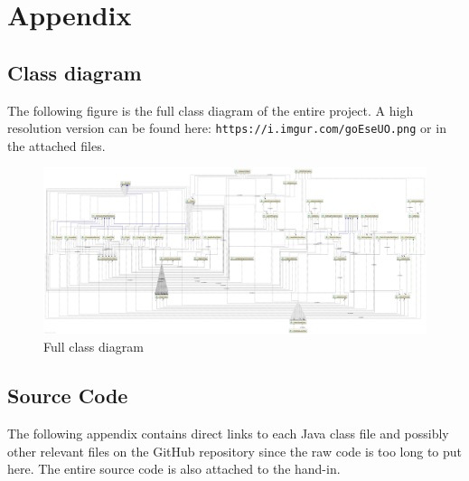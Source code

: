 \documentclass[12p]{article}
\begin{document}
\newpage
\printbibliography[heading=bibintoc,title={References}]


\newpage
\appendix

\section{Appendix}

\subsection{Class diagram} \label{AppendixClassDiagramFull}

The following figure is the full class diagram of the entire project. A high resolution version can be found here: \texttt{https://i.imgur.com/goEseUO.png} or in the attached files.

\begin{figure}[ht]
 \centering
 \includegraphics[width=1\textwidth]{Documentation/class_diagram}
 \caption{Full class diagram}
 \label{fig:ClassDiagramFull}
\end{figure}


\newpage
\subsection{Source Code} \label{SourceCode}

The following appendix contains direct links to each Java class file and possibly other relevant files on the GitHub repository since the raw code is too long to put here. The entire source code is also attached to the hand-in.
\end{document}
